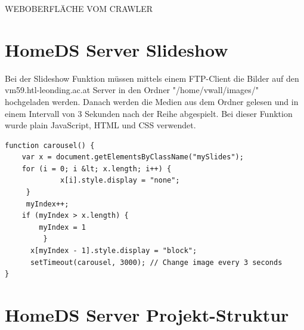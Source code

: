 WEBOBERFLÄCHE VOM CRAWLER

\section{HomeDS Server Slideshow}\label{sec:homedsslideshow}
Bei der Slideshow Funktion müssen mittels einem FTP-Client die Bilder auf den vm59.htl-leonding.ac.at Server in den Ordner "/home/vwall/images/" hochgeladen werden. Danach werden die Medien aus dem Ordner gelesen und in einem Intervall von 3 Sekunden nach der Reihe abgespielt. Bei dieser Funktion wurde plain JavaScript, HTML und CSS verwendet.

\begin{lstlisting}[caption=Carousel JavaScript]
function carousel() {
    var x = document.getElementsByClassName("mySlides");
    for (i = 0; i &lt; x.length; i++) {
    		 x[i].style.display = "none";
  	 }
     myIndex++;
   	if (myIndex > x.length) {
   		myIndex = 1
    	 }
      x[myIndex - 1].style.display = "block";
      setTimeout(carousel, 3000); // Change image every 3 seconds
}
\end{lstlisting}

\section{HomeDS Server Projekt-Struktur}\label{sec:javaeestruktur}
